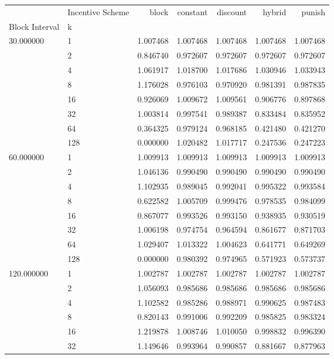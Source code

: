 \begin{tabular}{llrrrrr}
 & Incentive Scheme & block & constant & discount & hybrid & punish \\
Block Interval & k &  &  &  &  &  \\
\multirow[c]{8}{*}{30.000000} & 1 & 1.007468 & 1.007468 & 1.007468 & 1.007468 & 1.007468 \\
 & 2 & 0.846740 & 0.972607 & 0.972607 & 0.972607 & 0.972607 \\
 & 4 & 1.061917 & 1.018700 & 1.017686 & 1.030946 & 1.033943 \\
 & 8 & 1.176028 & 0.976103 & 0.970920 & 0.981391 & 0.987835 \\
 & 16 & 0.926069 & 1.009672 & 1.009561 & 0.906776 & 0.897868 \\
 & 32 & 1.003814 & 0.997541 & 0.989387 & 0.833484 & 0.835952 \\
 & 64 & 0.364325 & 0.979124 & 0.968185 & 0.421480 & 0.421270 \\
 & 128 & 0.000000 & 1.020482 & 1.017717 & 0.247536 & 0.247223 \\
\multirow[c]{8}{*}{60.000000} & 1 & 1.009913 & 1.009913 & 1.009913 & 1.009913 & 1.009913 \\
 & 2 & 1.046136 & 0.990490 & 0.990490 & 0.990490 & 0.990490 \\
 & 4 & 1.102935 & 0.989045 & 0.992041 & 0.995322 & 0.993584 \\
 & 8 & 0.622582 & 1.005709 & 0.999476 & 0.978535 & 0.984099 \\
 & 16 & 0.867077 & 0.993526 & 0.993150 & 0.938935 & 0.930519 \\
 & 32 & 1.006198 & 0.974754 & 0.964594 & 0.861677 & 0.871703 \\
 & 64 & 1.029407 & 1.013322 & 1.004623 & 0.641771 & 0.649269 \\
 & 128 & 0.000000 & 0.980392 & 0.974965 & 0.571923 & 0.573737 \\
\multirow[c]{8}{*}{120.000000} & 1 & 1.002787 & 1.002787 & 1.002787 & 1.002787 & 1.002787 \\
 & 2 & 1.056093 & 0.985686 & 0.985686 & 0.985686 & 0.985686 \\
 & 4 & 1.102582 & 0.985286 & 0.988971 & 0.990625 & 0.987483 \\
 & 8 & 0.820143 & 0.991006 & 0.992209 & 0.985825 & 0.983324 \\
 & 16 & 1.219878 & 1.008746 & 1.010050 & 0.998832 & 0.996390 \\
 & 32 & 1.149646 & 0.993964 & 0.990857 & 0.881667 & 0.877963 \\

\end{tabular}
